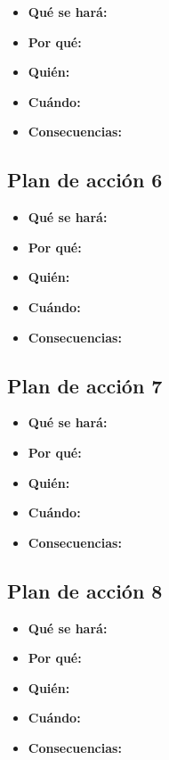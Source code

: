 \begin{itemize}
	\item \textbf{Qué se hará: }
	\item \textbf{Por qué: }
	\item \textbf{Quién: }
	\item \textbf{Cuándo: }
	\item \textbf{Consecuencias: }
\end{itemize}

\subsection{Plan de acción 6}

\begin{itemize}
	\item \textbf{Qué se hará: }
	\item \textbf{Por qué: }
	\item \textbf{Quién: }
	\item \textbf{Cuándo: }
	\item \textbf{Consecuencias: }
\end{itemize}

\subsection{Plan de acción 7}

\begin{itemize}
	\item \textbf{Qué se hará: }
	\item \textbf{Por qué: }
	\item \textbf{Quién: }
	\item \textbf{Cuándo: }
	\item \textbf{Consecuencias: }
\end{itemize}

\subsection{Plan de acción 8}

\begin{itemize}
	\item \textbf{Qué se hará: }
	\item \textbf{Por qué: }
	\item \textbf{Quién: }
	\item \textbf{Cuándo: }
	\item \textbf{Consecuencias: }
\end{itemize}

